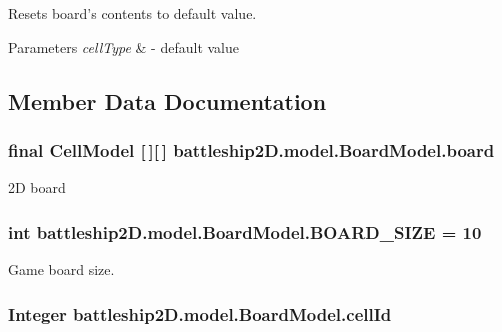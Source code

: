 Resets board's contents to default value. 


\begin{DoxyParams}{Parameters}
{\em cell\-Type} & -\/ default value \\
\hline
\end{DoxyParams}


\subsection{Member Data Documentation}
\hypertarget{classbattleship2D_1_1model_1_1BoardModel_aef391200a2e699e06c2f0efa9c75f93b}{
\subsubsection[{board}]{\setlength{\rightskip}{0pt plus 5cm}final {\bf Cell\-Model} \mbox{[}$\,$\mbox{]}\mbox{[}$\,$\mbox{]} battleship2\-D.\-model.\-Board\-Model.\-board\hspace{0.3cm}{\ttfamily [protected]}}}\label{classbattleship2D_1_1model_1_1BoardModel_aef391200a2e699e06c2f0efa9c75f93b}


2\-D board 

\hypertarget{classbattleship2D_1_1model_1_1BoardModel_ae460f6b5b6c201a4260f504cee2bbe88}{
\subsubsection[{B\-O\-A\-R\-D\-\_\-\-S\-I\-Z\-E}]{\setlength{\rightskip}{0pt plus 5cm}int battleship2\-D.\-model.\-Board\-Model.\-B\-O\-A\-R\-D\-\_\-\-S\-I\-Z\-E = 10\hspace{0.3cm}{\ttfamily [static]}}}\label{classbattleship2D_1_1model_1_1BoardModel_ae460f6b5b6c201a4260f504cee2bbe88}


Game board size. 

\hypertarget{classbattleship2D_1_1model_1_1BoardModel_a6a039e078208c6fe2df015b9b3e6bdf1}{
\subsubsection[{cell\-Id}]{\setlength{\rightskip}{0pt plus 5cm}Integer battleship2\-D.\-model.\-Board\-Model.\-cell\-Id\hspace{0.3cm}{\ttfamily [private]}}}\label{classbattleship2D_1_1model_1_1BoardModel_a6a039e078208c6fe2df015b9b3e6bdf1}


